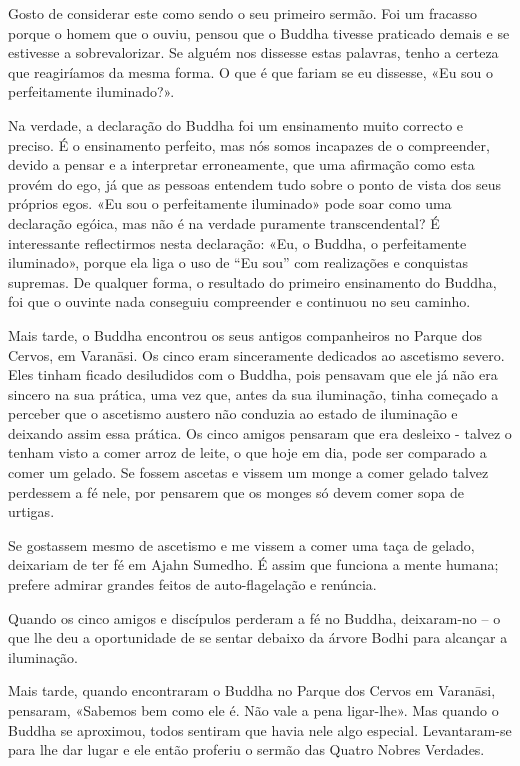 Gosto de considerar este como sendo o seu primeiro sermão. Foi um fracasso
porque o homem que o ouviu, pensou que o Buddha tivesse praticado demais e se
estivesse a sobrevalorizar. Se alguém nos dissesse estas palavras, tenho a
certeza que reagiríamos da mesma forma. O que é que fariam se eu dissesse, «Eu
sou o perfeitamente iluminado?».

Na verdade, a declaração do Buddha foi um ensinamento muito correcto e preciso.
É o ensinamento perfeito, mas nós somos incapazes de o compreender, devido a
pensar e a interpretar erroneamente, que uma afirmação como esta provém do ego,
já que as pessoas entendem tudo sobre o ponto de vista dos seus próprios egos.
«Eu sou o perfeitamente iluminado» pode soar como uma declaração egóica, mas não
é na verdade puramente transcendental? É interessante reflectirmos nesta declaração: 
«Eu, o Buddha, o perfeitamente iluminado», porque ela liga o uso de
“Eu sou” com realizações e conquistas supremas. De qualquer forma, o resultado
do primeiro ensinamento do Buddha, foi que o ouvinte nada conseguiu compreender
e continuou no seu caminho.

Mais tarde, o Buddha encontrou os seus antigos companheiros no Parque dos
Cervos, em Varanāsi. Os cinco eram sinceramente dedicados ao ascetismo severo.
Eles tinham ficado desiludidos com o Buddha, pois pensavam que ele já não era
sincero na sua prática, uma vez que, antes da sua iluminação, tinha começado a
perceber que o ascetismo austero não conduzia ao estado de iluminação e deixando assim essa prática. Os cinco amigos pensaram que era desleixo - talvez o tenham
visto a comer arroz de leite, o que hoje em dia, pode ser comparado a comer um
gelado. Se fossem ascetas e vissem um monge a comer gelado talvez perdessem a fé
nele, por pensarem que os monges só devem comer sopa de urtigas.

Se gostassem mesmo de ascetismo e me vissem a comer uma taça de gelado,
deixariam de ter fé em Ajahn Sumedho. É assim que funciona a mente humana;
prefere admirar grandes feitos de auto-flagelação e renúncia.

Quando os cinco amigos e discípulos perderam a fé no Buddha, deixaram-no – o que
lhe deu a oportunidade de se sentar debaixo da árvore Bodhi para alcançar a
iluminação.

Mais tarde, quando encontraram o Buddha no Parque dos Cervos em Varanāsi,
pensaram, «Sabemos bem como ele é. Não vale a pena ligar-lhe». Mas quando o
Buddha se aproximou, todos sentiram que havia nele algo especial. Levantaram-se
para lhe dar lugar e ele então proferiu o sermão das Quatro Nobres Verdades.

